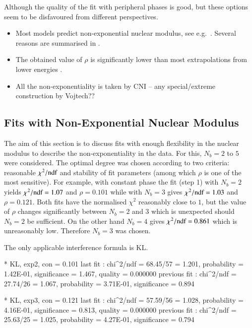 Although the quality of the fit with peripheral phases is good, but these options seem to be disfavoured from different perspectives.
\begin{itemize}
\item Most models predict non-exponential nuclear modulus, see e.g.~\cite{elegent}. Several reasons are summarised in .
\item The obtained value of $\rho$ is significantly lower than most extrapolations from lower energies .
\item All the non-exponentiality is taken by CNI -- any special/extreme construction by Vojtech?? 
\end{itemize}


\subsection{Fits with Non-Exponential Nuclear Modulus}
\label{sec:fit exp3}

The aim of this section is to discuss fits with enough flexibility in the nuclear modulus to describe the non-exponentiality in the data. For this, $N_b=2$ to $5$ were considered. The optimal degree was chosen according to two criteria: reasonable $\chi^2/\hbox{ndf}$ and stability of fit parameters (among which $\rho$ is one of the most sensitive). For example, with constant phase the fit (step 1) with $N_b=2$ yields $\chi^2/\hbox{ndf} = 1.07$ and $\rho = 0.101$ while with $N_b=3$ gives $\chi^2/\hbox{ndf} = 1.03$ and $\rho = 0.121$. Both fits have the normalised $\chi^2$ reasonably close to $1$, but the value of $\rho$ changes significantly between $N_b=2$ and $3$ which is unexpected should $N_b=2$ be sufficient. On the other hand $N_b=4$ gives $\chi^2/\hbox{ndf} = 0.861$ which is unreasonably low. Therefore $N_b=3$ was chosen.

The only applicable interference formula is KL.


\iffalse
* KL, exp2, con
\rh       =   0.101 
last fit     : chi^2/ndf = 68.45/57 = 1.201, probability = 1.42E-01, significance = 1.467, quality = 0.000000
previous fit : chi^2/ndf = 27.74/26 = 1.067, probability = 3.71E-01, significance = 0.894

* KL, exp3, con
\rh       =   0.121 
last fit     : chi^2/ndf = 57.59/56 = 1.028, probability = 4.16E-01, significance = 0.813, quality = 0.000000
previous fit : chi^2/ndf = 25.63/25 = 1.025, probability = 4.27E-01, significance = 0.794

